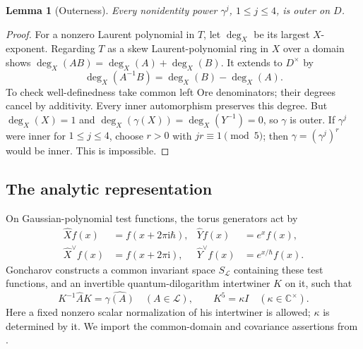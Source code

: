 \documentclass[11pt]{article}
\numberwithin{equation}{section}
\newtheorem{lemma}[lemma]{Lemma}
\theoremstyle{definition}
\theoremstyle{remark}
\newcommand{\C}{\mathbb C}
\newcommand{\ii}{\mathrm i}
\newcommand{\calL}{\mathcal L}
\newcommand{\qh}{\hbar}
\begin{document}
\begin{lemma}[Outerness]\label{lem:outer}
Every nonidentity power $\gamma^j$, $1\leq j\leq4$, is outer on $D$.
\end{lemma}
\begin{proof}
For a nonzero Laurent polynomial in $T$, let $\deg_X$ be its largest
$X$-exponent. Regarding $T$ as a skew Laurent-polynomial ring in $X$ over
a domain shows $\deg_X(AB)=\deg_X(A)+\deg_X(B)$. It extends to
$D^\times$ by
\[
 \deg_X(A^{-1}B)=\deg_X(B)-\deg_X(A).
\]
To check well-definedness take common left Ore denominators; their degrees
cancel by additivity. Every inner automorphism preserves this degree.
But $\deg_X(X)=1$ and $\deg_X(\gamma(X))=\deg_X(Y^{-1})=0$, so $\gamma$
is outer. If $\gamma^j$ were inner for $1\leq j\leq4$, choose $r>0$ with
$jr\equiv1\pmod5$; then $\gamma=(\gamma^j)^r$ would be inner. This is
impossible.
\end{proof}

\subsection{The analytic representation}

On Gaussian-polynomial test functions, the torus generators act by
\begin{equation}\label{eq:operators}
 \begin{aligned}
 \widehat X f(x)&=f(x+2\pi\ii\qh),&
 \widehat Y f(x)&=e^x f(x),\\
 \widehat X^\vee f(x)&=f(x+2\pi\ii),&
 \widehat Y^\vee f(x)&=e^{x/\qh}f(x).
 \end{aligned}
\end{equation}
Goncharov constructs a common invariant space $S_{\calL}$ containing these
test functions, and an invertible quantum-dilogarithm intertwiner $K$ on it,
such that
\begin{equation}\label{eq:analyticcov}
 K^{-1}\widehat A K=\widehat{\gamma(A)}\quad(A\in\calL),
 \qquad K^5=\kappa I\quad(\kappa\in\C^\times).
\end{equation}
Here a fixed nonzero scalar normalization of his intertwiner is allowed;
$\kappa$ is determined by it. We import the common-domain and covariance
assertions from \cite[Theorems~1.1, 2.3, 2.6]{Goncharov2007}.
\end{document}
